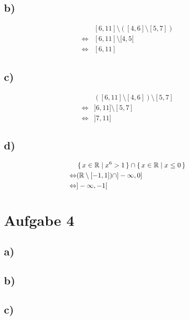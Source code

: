 \documentclass[a4paper, 11pt]{article}
\begin{document}
\subsection{b)}
\label{sec:orgc2bab99}
\begin{align*}
    & [6, 11] \setminus ([4, 6] \setminus [5, 7]) \\
    \Leftrightarrow & [6, 11] \setminus [4, 5[ \\
    \Leftrightarrow & [6, 11]
\end{align*}

\subsection{c)}
\label{sec:org1eba889}
\begin{align*}
    & ([6, 11] \setminus [4, 6]) \setminus [5, 7] \\
    \Leftrightarrow & ]6, 11] \setminus [5, 7] \\
    \Leftrightarrow & ]7, 11]
\end{align*}

\subsection{d)}
\label{sec:orgf5fdbf0}
\begin{align*}
    & \set{x \in \mathbb{R} | x^6 > 1} \cap \set{x \in \mathbb{R} | x \leq 0} \\
    \Leftrightarrow & (\mathbb{R} \setminus [-1, 1]) \cap ]-\infty, 0] \\
    \Leftrightarrow & ]-\infty, -1[
\end{align*}

\section{Aufgabe 4}
\label{sec:org54a0d59}
\subsection{a)}
\label{sec:org5358c36}

\subsection{b)}
\label{sec:org3e66e7d}

\subsection{c)}
\label{sec:org46b8302}
\end{document}
